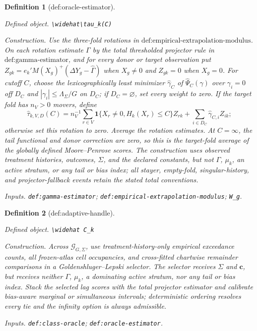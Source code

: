 \documentclass{article}
\newtheorem{definition}{Definition}
\begin{document}
\begin{definition}[def:oracle-estimator]\label{def:oracle-estimator}
\par\smallskip\noindent\emph{Defined object.} \texttt{\textbackslash{}\allowbreak{}widehat\textbackslash{}\allowbreak{}tau\_\allowbreak{}k(C)}
\par\smallskip\noindent\emph{Construction.} Use the three-fold rotations in \(\text{def:empirical-extrapolation-modulus}\). On each rotation estimate \(\Gamma\) by the total thresholded projector rule in \(\text{def:gamma-estimator}\), and for every donor or target observation put \(Z_{gk}=e_k'M(X_g)^+(\Delta Y_g-\widehat\Gamma)\) when \(X_g\ne0\) and \(Z_{gk}=0\) when \(X_g=0\). For cutoff \(C\), choose the lexicographically least minimizer \(\widehat\gamma_C\) of \(\widehat\Psi_C(\gamma)\) over \(\gamma_i=0\) off \(D_C\) and \(|\gamma_i|\le\Lambda_\Sigma/G\) on \(D_C\); if \(D_C=\varnothing\), set every weight to zero. If the target fold has \(n_V>0\) movers, define \[\widehat\tau_{k,V,D}(C)=n_V^{-1}\sum_{r\in V}\mathbf 1\{X_r\ne0,H_k(X_r)\le C\}Z_{rk}+\sum_{i\in D_C}\widehat\gamma_{C,i}Z_{ik};\] otherwise set this rotation to zero. Average the rotation estimates. At \(C=\infty\), the tail functional and donor correction are zero, so this is the target-fold average of the globally defined Moore--Penrose scores. The construction uses observed treatment histories, outcomes, \(\Sigma\), and the declared constants, but not \(\Gamma\), \(\mu_k\), an active stratum, or any tail or bias index; all stayer, empty-fold, singular-history, and projector-fallback events retain the stated total conventions.
\par\smallskip\noindent\emph{Inputs.} \texttt{def:\allowbreak{}gamma-\allowbreak{}estimator}; \texttt{def:\allowbreak{}empirical-\allowbreak{}extrapolation-\allowbreak{}modulus}; \texttt{W\_\allowbreak{}g}.
\end{definition}

\begin{definition}[def:adaptive-handle]\label{def:adaptive-handle}
\par\smallskip\noindent\emph{Defined object.} \texttt{\textbackslash{}\allowbreak{}widehat C\_\allowbreak{}k}
\par\smallskip\noindent\emph{Construction.} Across \(\mathcal G_{G,\Sigma}\), use treatment-history-only empirical exceedance counts, all frozen-atlas cell occupancies, and cross-fitted chartwise remainder comparisons in a Goldenshluger--Lepski selector. The selector receives \(\Sigma\) and \(\mathbf c\), but receives neither \(\Gamma\), \(\mu_k\), a dominating active stratum, nor any tail or bias index. Stack the selected lag scores with the total projector estimator and calibrate bias-aware marginal or simultaneous intervals; deterministic ordering resolves every tie and the infinity option is always admissible.
\par\smallskip\noindent\emph{Inputs.} \texttt{def:\allowbreak{}class-\allowbreak{}oracle}; \texttt{def:\allowbreak{}oracle-\allowbreak{}estimator}.
\end{definition}
\end{document}
